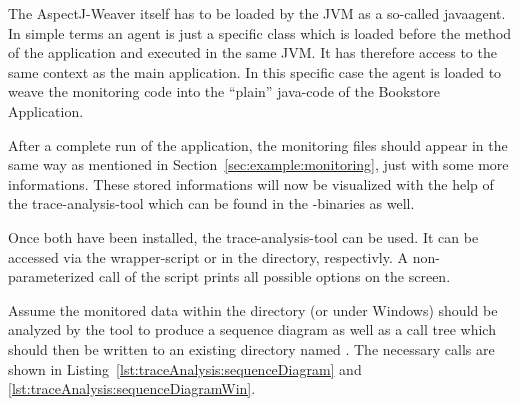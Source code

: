 The AspectJ-Weaver itself has to be loaded by the JVM as a so-called javaagent. In simple terms an agent is just a specific class which is loaded before the  method of the application and executed in the same JVM. It has therefore access to the same context as the main application. In this specific case the agent is loaded to weave the monitoring code into the ``plain'' java-code of the Bookstore Application.

\setBashListing



After a complete run of the application, the monitoring files should appear in the same way as mentioned in Section~\ref{sec:example:monitoring}, just with some more informations. These stored informations will now be visualized with the help of the trace-analysis-tool which can be found in the \Kieker{}-binaries as well.\\

 \vspace{3mm}

\noindent Once both have been installed, the trace-analysis-tool can be used. It can be accessed via the wrapper-script  or  in the  directory, respectivly.  A non-parameterized call of the script prints all possible options on the screen.

Assume the monitored data within the directory  (or  under Windows) should be analyzed by the tool to produce a sequence diagram as well as a call tree which should then be written to an existing directory named . %
The necessary calls are shown in Listing~\ref{lst:traceAnalysis:sequenceDiagram} and \ref{lst:traceAnalysis:sequenceDiagramWin}.

